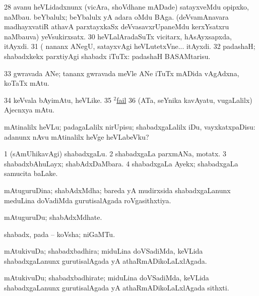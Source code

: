 \num{28}  avanu heVLidadxnunx (vicAra, shoVdhane mADade) satayxveMdu opipxko, naMbau. 
  
\banum
{} beYbalulx; beYbalulx yA adara oMdu BAga. 
 (deVvamAnavara madhayxvatiR athavA parxtayxkaSx deVvasavxrUpaneMdu kerxYsatxru naMbauva) yeVsukirxsatx. 
\eanum
\numie
\num{30}  heVLalAradaSuTx vicitarx, hAsAyxsapxda, itAyxdi. 
\num{31}  (  nananx ANegU, satayxvAgi heVLutetxVne... itAyxdi. 
\num{32}  padashaH; shabadxkekx parxtiyAgi shabadx iTuTx:  padashaH BASAMtarisu. 
\num{33}  gwravada ANe; tananx gwravada meVle ANe iTuTx mADida vAgAdxna, koTaTx mAtu. 
\num{34}  keVvala bAyimAtu, heVLike. 
\num{35}  \hyperref{kandict_f.pdf}{F}{fail(2) nuga}{$^2$fail}  
\num{36}  (ATa, seYnika kavAyatu, \mo vugaLalilx) Ajecnxya mAtu. 
\enum
\emng
\eentry

\bentry
{} 
\gl{\sakirx}
\expl{}
\bmng
mAtinalilx heVLu; padagaLalilx nirUpisu; shabadxgaLalilx iDu, vayxkatxpaDisu:  adanunx nAvu mAtinalilx heVge heVLabeVku? 
\emng
\eentry

\bentry
{} 
\gl{\nA}
\expl{}
\bmng
\bnum
\num{1} (sAmUhikavAgi) shabadxgaLu. 
\num{2} shabadxgaLa parxmANa, motatx. 
\num{3} shabadxbAhuLayx; shabAdxDaMbara. 
\num{4} shabadxgaLa Ayekx; shabadxgaLa samucita baLake. 
\enum
\emng
\eentry

\bentry
{} 
\gl{\gu}
\expl{}
\bmng
mAtuguruDina; shabAdxMdha; bareda yA mudirxsida shabadxgaLanunx meduLina doVadiMda gurutisalAgada roVgasithxtiya. 
\emng
\eentry

\bentry
{} 
\gl{\nA}
\expl{}
\bmng
mAtuguruDu; shabAdxMdhate. 
\emng
\eentry

\bentry
{} 
\gl{\nA}
\expl{}
\bmng
shabadx, pada -- koVsha; niGaMTu. 
\emng
\eentry

\bentry
{} 
\gl{\gu}
\expl{}
\bmng
mAtukivuDa; shabadxbadhira; miduLina doVSadiMda, keVLida shabadxgaLanunx gurutisalAgada yA athaRmADikoLaLxlAgada. 
\emng
\eentry

\bentry
{} 
\gl{\nA}
\expl{}
\bmng
mAtukivuDu; shabadxbadhirate; miduLina doVSadiMda, keVLida shabadxgaLanunx gurutisalAgada yA athaRmADikoLaLxlAgada sithxti. 
\emng
\eentry

